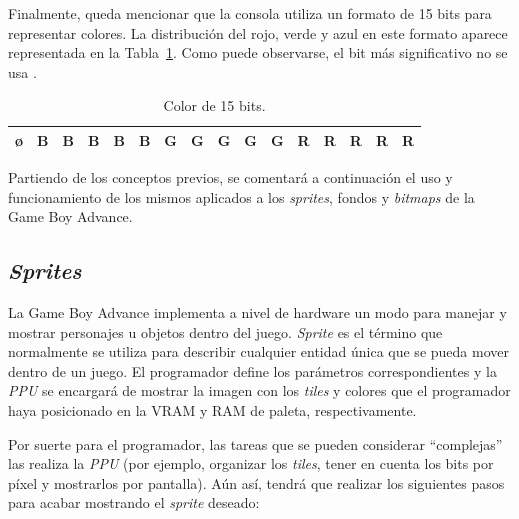 Finalmente, queda mencionar que la consola utiliza un formato de 15 bits para representar colores. La distribución del rojo, verde y azul en este formato aparece representada en la Tabla~\ref{tab:15bit_color}. Como puede observarse, el bit más significativo no se usa \cite{bib:gba_manual}.

\begin{table}[h]
	\centering
	\begin{tabular}{| l | l | l | l | l | l | l | l | l | l | l | l | l | l | l | l |}
		\hline
		\o  & B & B & B & B & B & G & G & G & G & G & R & R & R & R & R \\ \hline
	\end{tabular}
	\caption{Color de 15 bits.}
	\label{tab:15bit_color}
\end{table}

Partiendo de los conceptos previos, se comentará a continuación el uso y funcionamiento de los mismos aplicados a los \textit{sprites}, fondos y \textit{bitmaps} de la Game Boy Advance.

\subsection{\textit{Sprites}}\label{sec:sprites}
La Game Boy Advance implementa a nivel de hardware un modo para manejar y mostrar personajes u objetos dentro del juego. \textit{Sprite} es el término que normalmente se utiliza para describir cualquier entidad única que se pueda mover dentro de un juego. El programador define los parámetros correspondientes y la \textit{PPU} se encargará de mostrar la imagen con los \textit{tiles} y colores que el programador haya posicionado en la VRAM y RAM de paleta, respectivamente. 

Por suerte para el programador, las tareas que se pueden considerar ``complejas'' las realiza la \textit{PPU} (por ejemplo, organizar los \textit{tiles}, tener en cuenta los bits por píxel y mostrarlos por pantalla). Aún así, tendrá que realizar los siguientes pasos para acabar mostrando el \textit{sprite} deseado:

